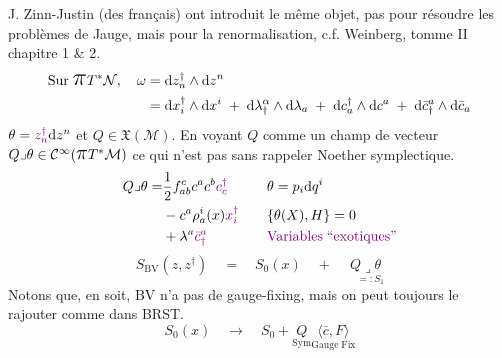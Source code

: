 \documentclass[a4paper,11pt]{article}
\renewcommand{\d}{{\mathrm{d}}}
\newcommand{\ppi}{{\mathlarger{\mathlarger{\mathlarger{\pi}}}}}
\begin{document}
J. Zinn-Justin (des français) ont introduit le même objet, pas pour résoudre les problèmes de Jauge, mais pour la renormalisation, c.f. Weinberg, tomme II chapitre 1 \& 2.
\begin{align*}
\mathrm{Sur}\;\ppi T^*\mathcal N, \quad \omega &= \d z^\dag_n \wedge \d z^n\\
&= \d x^\dag_i\wedge \d x^i \;+\; \d \lambda^\alpha_\dag \wedge \d \lambda_a \;+\; \d c^\dag_a\wedge \d c^a \;+\; \d\bar c^a_\dag \wedge \d \bar c_a
\end{align*}
$\theta = \color{violet}z^\dag_n\color{black}\d z^n$ et $Q\in\mathfrak{X}(\mathcal{M})$. En voyant $Q$ comme un champ de vecteur $Q\lrcorner \theta\in\mathcal{C}^\infty(\ppi T^*\mathcal{M})$ ce qui n'est pas sans rappeler Noether symplectique.
\begin{align*}
Q\lrcorner\theta =& \frac12 f^c_{ab}c^ac^b\color{violet}c^\dag_c &&&& \theta = p_i\d q^i\\
&-c^a\rho^i_a(x)\color{violet}x^\dag_i &&&& \{\theta(X),H\}=0\\
&+\lambda^a\color{violet}\bar c^a_\dag &&&& \color{violet}\mathrm{Variables}\;``\mathrm{exotiques}"\color{black}
\end{align*}
$$S_\mathrm{BV}(z,z^\dag) \quad = \quad S_0(x) \quad + \quad \underset{\quad =:S_1}{Q\lrcorner\theta}$$
Notons que, en soit, BV n'a pas de gauge-fixing, mais on peut toujours le rajouter comme dans BRST.
$$S_0(x) \quad \longrightarrow \quad S_0 + \underset{\mathrm{Sym}}Q\underset{\mathrm{Gauge}\;\mathrm{Fix}}{\langle\bar c, F\rangle}$$
\end{document}

